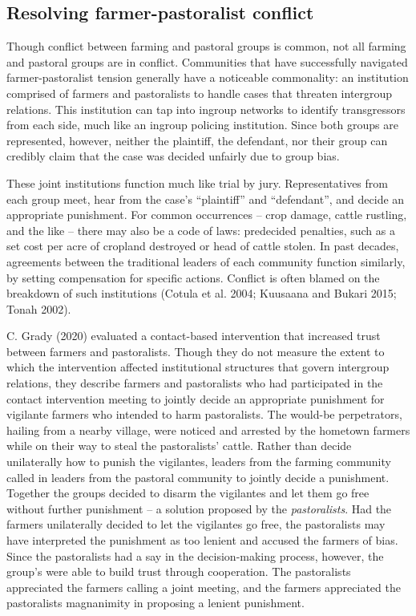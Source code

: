 \documentclass[11pt]{article}
\begin{document}
\hypertarget{resolving-farmer-pastoralist-conflict}{%
\subsection{Resolving farmer-pastoralist
conflict}\label{resolving-farmer-pastoralist-conflict}}

Though conflict between farming and pastoral groups is common, not all
farming and pastoral groups are in conflict. Communities that have
successfully navigated farmer-pastoralist tension generally have a
noticeable commonality: an institution comprised of farmers and
pastoralists to handle cases that threaten intergroup relations. This
institution can tap into ingroup networks to identify transgressors from
each side, much like an ingroup policing institution. Since both groups
are represented, however, neither the plaintiff, the defendant, nor
their group can credibly claim that the case was decided unfairly due to
group bias.

These joint institutions function much like trial by jury.
Representatives from each group meet, hear from the case's ``plaintiff''
and ``defendant'', and decide an appropriate punishment. For common
occurrences -- crop damage, cattle rustling, and the like -- there may
also be a code of laws: predecided penalties, such as a set cost per
acre of cropland destroyed or head of cattle stolen. In past decades,
agreements between the traditional leaders of each community function
similarly, by setting compensation for specific actions. Conflict is
often blamed on the breakdown of such institutions (Cotula et al. 2004;
Kuusaana and Bukari 2015; Tonah 2002).

C. Grady (2020) evaluated a contact-based intervention that increased
trust between farmers and pastoralists. Though they do not measure the
extent to which the intervention affected institutional structures that
govern intergroup relations, they describe farmers and pastoralists who
had participated in the contact intervention meeting to jointly decide
an appropriate punishment for vigilante farmers who intended to harm
pastoralists. The would-be perpetrators, hailing from a nearby village,
were noticed and arrested by the hometown farmers while on their way to
steal the pastoralists' cattle. Rather than decide unilaterally how to
punish the vigilantes, leaders from the farming community called in
leaders from the pastoral community to jointly decide a punishment.
Together the groups decided to disarm the vigilantes and let them go
free without further punishment -- a solution proposed by the
\emph{pastoralists}. Had the farmers unilaterally decided to let the
vigilantes go free, the pastoralists may have interpreted the punishment
as too lenient and accused the farmers of bias. Since the pastoralists
had a say in the decision-making process, however, the group's were able
to build trust through cooperation. The pastoralists appreciated the
farmers calling a joint meeting, and the farmers appreciated the
pastoralists magnanimity in proposing a lenient punishment.
\end{document}
